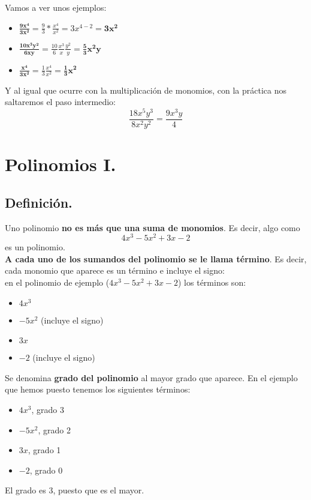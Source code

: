 \documentclass[a4paper,11pt,answers]{exam}
\begin{document}
  Vamos a ver unos ejemplos:
  \begin{itemize}
  \item $\boldsymbol{\frac{9x^4}{3x^2}}= \frac{9}{3}*\frac{x^4}{x^2} = 3 x^{4-2} = \boldsymbol{3x^2}$
  \item $\boldsymbol{\frac{10x^3 y^2}{6xy}} = \frac{10}{6} \frac{x^3}{x} \frac{y^2}{y} = \boldsymbol{\frac{5}{3}x^2 y}$
  \item $\boldsymbol{\frac{x^4}{3x^2}} = \frac{1}{3}\frac{x^4}{x^2} =
    \boldsymbol{\frac{1}{3}x^2}$
  \end{itemize}

  Y al igual que ocurre con la multiplicación de monomios, con la práctica nos saltaremos el paso intermedio:
  \[\frac{18x^5y^3}{8x^2 y^2} =\frac{9x^3 y}{4}\]

  \section{Polinomios I.}
  \subsection{Definición.}
  Uno polinomio \textbf{no es más que una suma de monomios}. Es decir, algo como
  \[4x^3 - 5x^2 + 3x -2\]
  es un polinomio.\\

  \textbf{A cada uno de los sumandos del polinomio se le llama término}. Es decir, cada monomio que aparece es un término e incluye el signo:\\
  en el polinomio de ejemplo ($4x^3 - 5x^2 + 3x -2$) los términos son:
  \begin{multicols}{2}
    \begin{itemize}
    \item $4x^3$
    \item $-5x^2$ (incluye el signo)
    \item $3x$
    \item $-2$ (incluye el signo)
    \end{itemize}
  \end{multicols}

  Se denomina \textbf{grado del polinomio} al mayor grado que aparece. En el ejemplo que hemos puesto tenemos los siguientes términos:
  \begin{multicols}{2}
    \begin{itemize}
    \item $4x^3$, grado 3
    \item $-5x^2$, grado 2
    \item $3x$, grado 1
    \item $-2$, grado 0
    \end{itemize}
  \end{multicols}
  El grado es 3, puesto que es el mayor.
\end{document}
